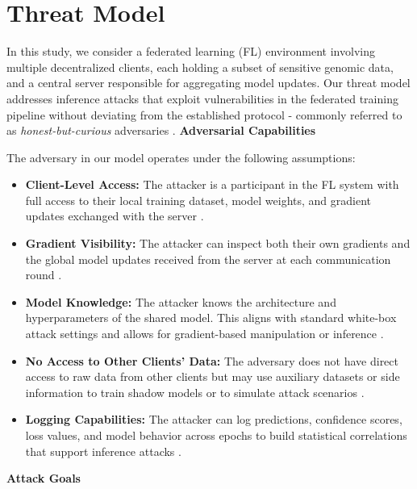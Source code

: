 \documentclass[conference]{IEEEtran}
\begin{document}
\section{Threat Model}

In this study, we consider a federated learning (FL) environment involving multiple decentralized clients, each holding a subset of sensitive genomic data, and a central server responsible for aggregating model updates. Our threat model addresses inference attacks that exploit vulnerabilities in the federated training pipeline without deviating from the established protocol - commonly referred to as \textit{honest-but-curious} adversaries \cite{Zhao_2025_29}\cite{suri2023subject7}\cite{kairouz2021advances36}.
\newline
\newline
\textbf{Adversarial Capabilities}

The adversary in our model operates under the following assumptions:
\begin{itemize}
    \item \textbf{Client-Level Access:} The attacker is a participant in the FL system with full access to their local training dataset, model weights, and gradient updates exchanged with the server \cite{suri2023subject7}\cite{driouich2022a32}.
    \item \textbf{Gradient Visibility:} The attacker can inspect both their own gradients and the global model updates received from the server at each communication round \cite{Zhao_2025_29}\cite{driouich2022a32}.
    \item \textbf{Model Knowledge:} The attacker knows the architecture and hyperparameters of the shared model. This aligns with standard white-box attack settings and allows for gradient-based manipulation or inference \cite{bai2024membership4}\cite{momin2022generalized21}.
    \item \textbf{No Access to Other Clients’ Data:} The adversary does not have direct access to raw data from other clients but may use auxiliary datasets or side information to train shadow models or to simulate attack scenarios \cite{Zhao_2025_29}\cite{suri2023subject7}.
    \item \textbf{Logging Capabilities:} The attacker can log predictions, confidence scores, loss values, and model behavior across epochs to build statistical correlations that support inference attacks \cite{suri2023subject7}\cite{driouich2022a32}.
\end{itemize}
\textbf{Attack Goals}
\end{document}

